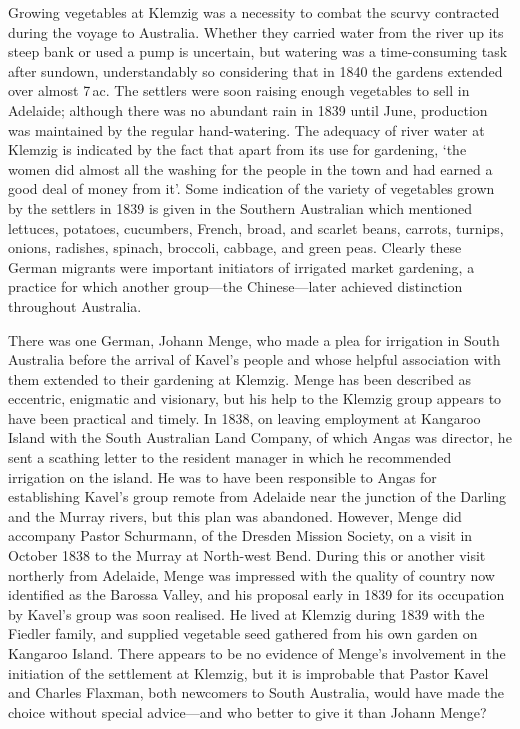 Growing vegetables at Klemzig was a necessity to combat the scurvy
contracted during the voyage to Australia.  Whether they carried water
from the river up its steep bank or used a pump is uncertain, but
watering was a time-consuming task after sundown, understandably so
considering that in 1840 the gardens extended over almost 7\,ac. The
settlers were soon raising enough vegetables to sell in Adelaide;
although there was no abundant rain in 1839 until June, production was
maintained by the regular hand-watering.  The adequacy of river water
at Klemzig is indicated by the fact that apart from its use for
gardening, `the women did almost all the washing for the people in the
town and had earned a good deal of money from it'.  Some indication of
the variety of vegetables grown by the settlers in 1839 is given in
the Southern Australian which mentioned lettuces, potatoes, cucumbers,
French, broad, and scarlet beans, carrots, turnips, onions, radishes,
spinach, broccoli, cabbage, and green peas. Clearly these German
migrants were important initiators of irrigated market gardening, a
practice for which another group---the Chinese---later achieved
distinction throughout Australia.

There was one German, Johann Menge, who made a plea for irrigation in
South Australia before the arrival of Kavel's people and whose helpful
association with them extended to their gardening at Klemzig.  Menge
has been described as eccentric, enigmatic and visionary, but his help
to the Klemzig group appears to have been practical and timely.  In
1838, on leaving employment at Kangaroo Island with the South
Australian Land Company, of which Angas was director, he sent a
scathing letter to the resident manager in which he recommended
irrigation on the island.  He was to have been responsible to Angas for
establishing Kavel's group remote from Adelaide near the junction of
the Darling and the Murray rivers, but this plan was abandoned.
However, Menge did accompany Pastor Schurmann, of the Dresden Mission
Society, on a visit in October 1838 to the Murray at North-west
Bend.  During this or another visit northerly
from Adelaide, Menge was impressed with the quality of country now
identified as the Barossa Valley, and his proposal early in 1839 for
its occupation by Kavel's group was soon realised.  He lived at
Klemzig during 1839 with the Fiedler family, and supplied vegetable
seed gathered from his own garden on Kangaroo
Island.  There appears to be no
evidence of Menge's involvement in the initiation of the settlement at
Klemzig, but it is improbable that Pastor Kavel and Charles Flaxman,
both newcomers to South Australia, would have made the choice without
special advice---and who better to give it than Johann Menge?

